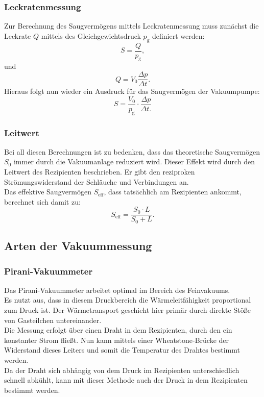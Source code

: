 		\subsubsection{Leckratenmessung}
			
			\noindent
			Zur Berechnung des Saugvermögens mittels Leckratenmessung muss zunächst die Leckrate $Q$ mittels des Gleichgewichtsdruck $p_\text{g}$ definiert werden:
			\begin{equation}
				S = \frac{Q}{p_\text{g}},
			\end{equation}
			und
			\begin{equation}
				Q = V_0 \frac{\Delta p}{\Delta t}.
			\end{equation}
			Hieraus folgt nun wieder ein Ausdruck für das Saugvermögen der Vakuumpumpe:
			\begin{equation}
				S = \frac{V_0}{p_\text{g}} \cdot \frac{\Delta p}{\Delta t.}
			\end{equation}
		\subsubsection{Leitwert}

			\noindent
			Bei all diesen Berechnungen ist zu bedenken, dass das theoretische Saugvermögen $S_0$ immer durch die Vakuumanlage reduziert wird.
			Dieser Effekt wird durch den Leitwert des Rezipienten beschrieben. Er gibt den reziproken Strömungswiderstand der Schläuche und Verbindungen an.\\
			Das effektive Saugvermögen $S_\text{eff}$, dass tatsächlich am Rezipienten ankommt, berechnet sich damit zu:
			\begin{equation}
				S_\text{eff} = \frac{S_0 \cdot L}{S_0 + L}.
			\end{equation}

	\subsection{Arten der Vakuummessung}
		
		\subsubsection{Pirani-Vakuummeter}
			
			\noindent
			Das Pirani-Vakuummeter arbeitet optimal im Bereich des Feinvakuums.\\
			Es nutzt aus, dass in diesem Druckbereich die Wärmeleitfähigkeit proportional zum Druck ist. 
			Der Wärmetransport geschieht hier primär durch direkte Stöße von Gasteilchen untereinander. \\
			Die Messung erfolgt über einen Draht in dem Rezipienten, durch den ein konstanter Strom fließt.
			Nun kann mittels einer Wheatstone-Brücke der Widerstand dieses Leiters und somit die Temperatur des Drahtes bestimmt werden.\\
			Da der Draht sich abhängig von dem Druck im Rezipienten unterschiedlich schnell abkühlt, kann mit dieser Methode auch der Druck in dem Rezipienten bestimmt werden.


